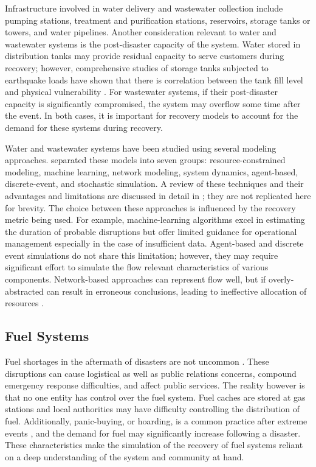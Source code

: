 Infrastructure involved in water delivery and wastewater collection include pumping stations, treatment and purification stations, reservoirs, storage tanks or towers, and water pipelines. Another consideration relevant to water and wastewater systems is the post-disaster capacity of the system. Water stored in distribution tanks may provide residual capacity to serve customers during recovery; however, comprehensive studies of storage tanks subjected to earthquake loads have shown that there is correlation between the tank fill level and physical vulnerability \citep{cooper1997study, orourke2000seismic, eidinger2012recent}. For wastewater systems, if their post-disaster capacity is significantly compromised, the system may overflow some time after the event. In both cases, it is important for recovery models to account for the demand for these systems during recovery.\

Water and wastewater systems have been studied using several modeling approaches. \citet{miles2019community} separated these models into seven groups: resource-constrained modeling, machine learning, network modeling, system dynamics, agent-based, discrete-event, and stochastic simulation. A review of these techniques and their advantages and limitations are discussed in detail in \citet{miles2019community}; they are not replicated here for brevity. The choice between these approaches is influenced by the recovery metric being used. For example, machine-learning algorithms excel in estimating the duration of probable disruptions but offer limited guidance for operational management especially in the case of insufficient data. Agent-based and discrete event simulations do not share this limitation; however, they may require significant effort to simulate the flow relevant characteristics of various components. Network-based approaches can represent flow well, but if overly-abstracted can result in erroneous conclusions, leading to ineffective allocation of resources \citep{Hines2010a}. \

\subsection{Fuel Systems}
Fuel shortages in the aftermath of disasters are not uncommon \citep{Smythe2013, Holguin-Veras2014}. These disruptions can cause logistical as well as public relations concerns, compound emergency response difficulties, and affect public services. The reality however is that no one entity has control over the fuel system. Fuel caches are stored at gas stations and local authorities may have difficulty controlling the distribution of fuel. Additionally, panic-buying, or hoarding, is a common practice after extreme events \citep{shen2017development, helbing2006disasters}, and the demand for fuel may significantly increase following a disaster. These characteristics make the simulation of the recovery of fuel systems reliant on a deep understanding of the system and community at hand. \

